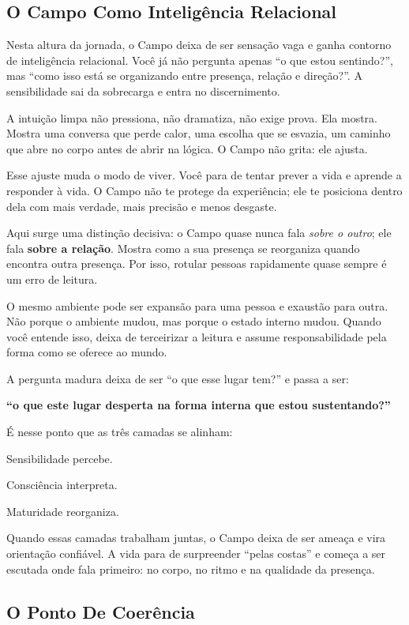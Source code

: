 \documentclass[12pt]{book}
\begin{document}
\subsection*{O Campo Como Inteligência Relacional}

Nesta altura da jornada, o Campo deixa de ser sensação vaga e ganha contorno de inteligência relacional. Você já não pergunta apenas \enquote{o que estou sentindo?}, mas \enquote{como isso está se organizando entre presença, relação e direção?}. A sensibilidade sai da sobrecarga e entra no discernimento.

A intuição limpa não pressiona, não dramatiza, não exige prova. Ela mostra. Mostra uma conversa que perde calor, uma escolha que se esvazia, um caminho que abre no corpo antes de abrir na lógica. O Campo não grita: ele ajusta.

Esse ajuste muda o modo de viver. Você para de tentar prever a vida e aprende a responder à vida. O Campo não te protege da experiência; ele te posiciona dentro dela com mais verdade, mais precisão e menos desgaste.

Aqui surge uma distinção decisiva: o Campo quase nunca fala \textit{sobre o outro}; ele fala \textbf{sobre a relação}. Mostra como a sua presença se reorganiza quando encontra outra presença. Por isso, rotular pessoas rapidamente quase sempre é um erro de leitura.

O mesmo ambiente pode ser expansão para uma pessoa e exaustão para outra. Não porque o ambiente mudou, mas porque o estado interno mudou. Quando você entende isso, deixa de terceirizar a leitura e assume responsabilidade pela forma como se oferece ao mundo.

A pergunta madura deixa de ser \enquote{o que esse lugar tem?} e passa a ser:

\textbf{\enquote{o que este lugar desperta na forma interna que estou sustentando?}}

É nesse ponto que as três camadas se alinham:

Sensibilidade percebe.

Consciência interpreta.

Maturidade reorganiza.

Quando essas camadas trabalham juntas, o Campo deixa de ser ameaça e vira orientação confiável. A vida para de surpreender \enquote{pelas costas} e começa a ser escutada onde fala primeiro: no corpo, no ritmo e na qualidade da presença.

\subsection*{O Ponto De Coerência}
\end{document}
